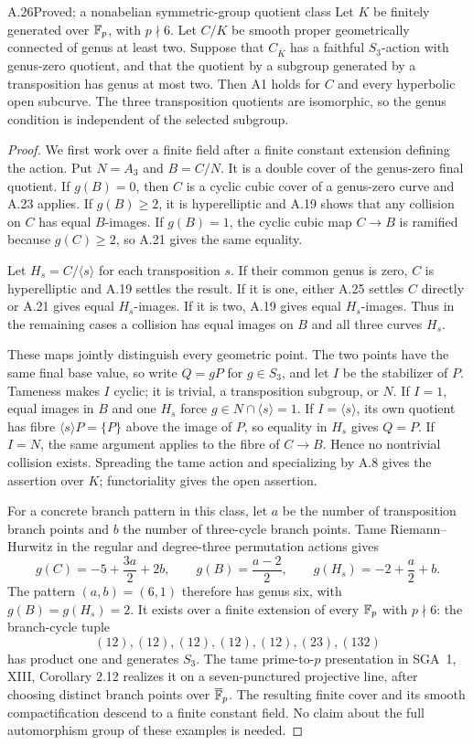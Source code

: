 \begin{claim}{A.26}{Proved; a nonabelian symmetric-group quotient class}
Let $K$ be finitely generated over $\mathbb F_p$, with
$p\nmid6$. Let $C/K$ be smooth proper geometrically
connected of genus at least two. Suppose that
$C_{\overline K}$ has a faithful $S_3$-action with
genus-zero quotient, and that the quotient by a subgroup
generated by a transposition has genus at most two.
Then A1 holds for $C$ and every hyperbolic open subcurve.
The three transposition quotients are isomorphic, so the
genus condition is independent of the selected subgroup.
\end{claim}
\begin{proof}
We first work over a finite field after a finite constant
extension defining the action. Put $N=A_3$ and $B=C/N$.
It is a double cover of the genus-zero final quotient.
If $g(B)=0$, then $C$ is a cyclic cubic cover of a
genus-zero curve and A.23 applies. If $g(B)\ge2$, it is
hyperelliptic and A.19 shows that any collision on $C$
has equal $B$-images. If $g(B)=1$, the cyclic cubic map
$C\to B$ is ramified because $g(C)\ge2$, so A.21 gives
the same equality.

Let $H_s=C/\langle s\rangle$ for each transposition $s$.
If their common genus is zero, $C$ is hyperelliptic and
A.19 settles the result. If it is one, either A.25
settles $C$ directly or A.21 gives equal $H_s$-images.
If it is two, A.19 gives equal $H_s$-images. Thus in the
remaining cases a collision has equal images on $B$ and
all three curves $H_s$.

These maps jointly distinguish every geometric point.
The two points have the same final base value, so write
$Q=gP$ for $g\in S_3$, and let $I$ be the stabilizer of
$P$. Tameness makes $I$ cyclic; it is trivial, a
transposition subgroup, or $N$. If $I=1$, equal images
in $B$ and one $H_s$ force
$g\in N\cap\langle s\rangle=1$. If
$I=\langle s\rangle$, its own quotient has fibre
$\langle s\rangle P=\{P\}$ above the image of $P$, so
equality in $H_s$ gives $Q=P$. If $I=N$, the same
argument applies to the fibre of $C\to B$. Hence no
nontrivial collision exists. Spreading the tame action
and specializing by A.8 gives the assertion over $K$;
functoriality gives the open assertion.

For a concrete branch pattern in this class, let $a$ be
the number of transposition branch points and $b$ the
number of three-cycle branch points. Tame
Riemann--Hurwitz in the regular and degree-three
permutation actions gives
\[
 g(C)=-5+\frac{3a}{2}+2b,\qquad
 g(B)=\frac{a-2}{2},\qquad
 g(H_s)=-2+\frac a2+b.
\]
The pattern $(a,b)=(6,1)$ therefore has genus six, with
$g(B)=g(H_s)=2$. It exists over a finite extension of
every $\mathbb F_p$ with $p\nmid6$: the branch-cycle tuple
\[
 (12),(12),(12),(12),(12),(23),(132)
\]
has product one and generates $S_3$. The tame
prime-to-$p$ presentation in SGA~1, XIII, Corollary 2.12
realizes it on a seven-punctured projective line, after
choosing distinct branch points over $\overline{\mathbb F}_p$.
The resulting finite cover and its smooth compactification
descend to a finite constant field. No claim about the
full automorphism group of these examples is needed.
\end{proof}

